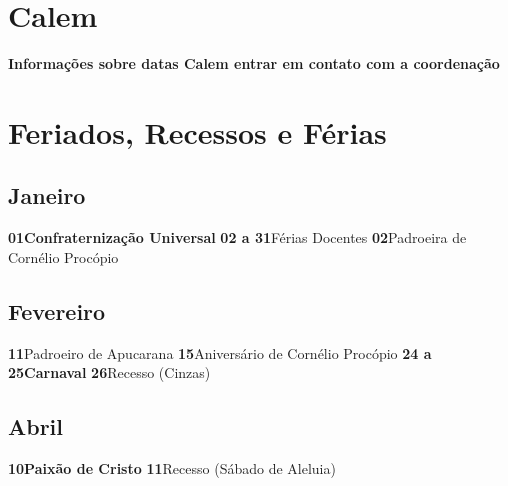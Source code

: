 \documentclass[thesis]{hmcposter}
\begin{document}
\begin{poster}
\newpage\section{\color{hmcorange}Calem}\textbf{Informações sobre datas Calem entrar em contato com a coordenação} \newpage\onespacing \small \section{\color{hmcorange}Feriados, Recessos e Férias}\subsection{Janeiro}\textbf{01}\quad \quad \quad \quad \textbf{Confraternização Universal} \newline\textbf{02 a 31}\quad \quad Férias Docentes \newline\textbf{02}\quad \quad \quad \quad Padroeira de Cornélio Procópio \newline\subsection{Fevereiro}\textbf{11}\quad \quad \quad \quad Padroeiro de Apucarana \newline\textbf{15}\quad \quad \quad \quad Aniversário de Cornélio Procópio \newline\textbf{24 a 25}\quad \quad \textbf{Carnaval} \newline\textbf{26}\quad \quad \quad \quad Recesso (Cinzas) \newline\subsection{Abril}\textbf{10}\quad \quad \quad \quad \textbf{Paixão de Cristo} \newline\textbf{11}\quad \quad \quad \quad Recesso (Sábado de Aleluia) \newline\te
\end{poster}
\end{document}

